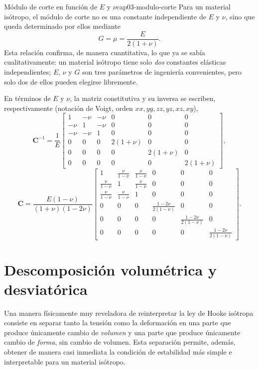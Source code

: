 \begin{ecnimportante}{Módulo de corte en función de $E$ y $\nu$}{cap03-modulo-corte}
Para un material isótropo, el módulo de corte no es una constante independiente de $E$ y $\nu$, sino que queda determinado por ellos mediante
\[
G = \mu = \frac{E}{2(1+\nu)}.
\]
Esta relación confirma, de manera cuantitativa, lo que ya se sabía cualitativamente: un material isótropo tiene solo \emph{dos} constantes elásticas independientes; $E$, $\nu$ y $G$ son tres parámetros de ingeniería convenientes, pero solo dos de ellos pueden elegirse libremente.
\end{ecnimportante}

En términos de $E$ y $\nu$, la matriz constitutiva y su inversa se escriben, respectivamente (notación de Voigt, orden $xx,yy,zz,yz,xz,xy$),
\[
\bm C^{-1} = \frac{1}{E}
\begin{bmatrix}
1 & -\nu & -\nu & 0 & 0 & 0 \\
-\nu & 1 & -\nu & 0 & 0 & 0 \\
-\nu & -\nu & 1 & 0 & 0 & 0 \\
0 & 0 & 0 & 2(1+\nu) & 0 & 0 \\
0 & 0 & 0 & 0 & 2(1+\nu) & 0 \\
0 & 0 & 0 & 0 & 0 & 2(1+\nu)
\end{bmatrix},
\]
\[
\bm C = \frac{E(1-\nu)}{(1+\nu)(1-2\nu)}
\begin{bmatrix}
1 & \frac{\nu}{1-\nu} & \frac{\nu}{1-\nu} & 0 & 0 & 0 \\
\frac{\nu}{1-\nu} & 1 & \frac{\nu}{1-\nu} & 0 & 0 & 0 \\
\frac{\nu}{1-\nu} & \frac{\nu}{1-\nu} & 1 & 0 & 0 & 0 \\
0 & 0 & 0 & \frac{1-2\nu}{2(1-\nu)} & 0 & 0 \\
0 & 0 & 0 & 0 & \frac{1-2\nu}{2(1-\nu)} & 0 \\
0 & 0 & 0 & 0 & 0 & \frac{1-2\nu}{2(1-\nu)}
\end{bmatrix}.
\]

\section{Descomposición volumétrica y desviatórica}
\label{sec:cap03-descomposicion}

Una manera físicamente muy reveladora de reinterpretar la ley de Hooke isótropa consiste en separar tanto la tensión como la deformación en una parte que produce únicamente cambio de \emph{volumen} y una parte que produce únicamente cambio de \emph{forma}, sin cambio de volumen. Esta separación permite, además, obtener de manera casi inmediata la condición de estabilidad más simple e interpretable para un material isótropo.

